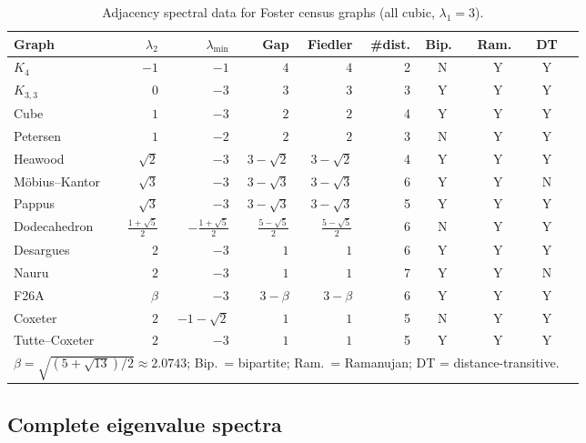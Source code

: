 \documentclass[11pt,a4paper]{article}
\begin{document}
\begin{table}[htbp]
\centering
\caption{Adjacency spectral data for Foster census graphs (all cubic, $\lambda_1 = 3$).}
\label{tab:spectra}
\small
\begin{tabular}{lrrrrrcccc}
\toprule
Graph & $\lambda_2$ & $\lambda_{\min}$ & Gap & Fiedler & \#dist. & Bip.\ & Ram.\ & DT \\
\midrule
$K_4$             & $-1$        & $-1$       & $4$      & $4$      & 2 & N & Y & Y \\
$K_{3,3}$         & $0$         & $-3$       & $3$      & $3$      & 3 & Y & Y & Y \\
Cube              & $1$         & $-3$       & $2$      & $2$      & 4 & Y & Y & Y \\
Petersen          & $1$         & $-2$       & $2$      & $2$      & 3 & N & Y & Y \\
Heawood           & $\sqrt{2}$  & $-3$       & $3-\sqrt{2}$ & $3-\sqrt{2}$ & 4 & Y & Y & Y \\
M\"{o}bius--Kantor & $\sqrt{3}$  & $-3$       & $3-\sqrt{3}$ & $3-\sqrt{3}$ & 6 & Y & Y & N \\
Pappus            & $\sqrt{3}$  & $-3$       & $3-\sqrt{3}$ & $3-\sqrt{3}$ & 5 & Y & Y & Y \\
Dodecahedron      & $\tfrac{1+\sqrt{5}}{2}$ & $-\tfrac{1+\sqrt{5}}{2}$ & $\tfrac{5-\sqrt{5}}{2}$ & $\tfrac{5-\sqrt{5}}{2}$ & 6 & N & Y & Y \\
Desargues         & $2$         & $-3$       & $1$      & $1$      & 6 & Y & Y & Y \\
Nauru             & $2$         & $-3$       & $1$      & $1$      & 7 & Y & Y & N \\
F26A              & $\beta$     & $-3$       & $3-\beta$ & $3-\beta$ & 6 & Y & Y & Y \\
Coxeter           & $2$         & $-1-\sqrt{2}$ & $1$  & $1$      & 5 & N & Y & Y \\
Tutte--Coxeter    & $2$         & $-3$       & $1$      & $1$      & 5 & Y & Y & Y \\
\bottomrule
\multicolumn{9}{l}{\small $\beta = \sqrt{(5+\sqrt{13})/2} \approx 2.0743$; Bip.\ = bipartite; Ram.\ = Ramanujan; DT = distance-transitive.}
\end{tabular}
\end{table}

\subsection{Complete eigenvalue spectra}
\end{document}
